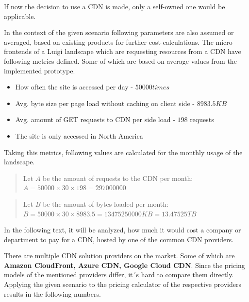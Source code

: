 If now the decision to use a CDN is made, only a self-owned one would be applicable.

In the context of the given scenario following parameters are also assumed or averaged, based on existing products for further cost-calculations.
The micro frontends of a Luigi landscape which are requesting resources from a CDN have following metrics defined. Some of which are based on average values from the implemented prototype.

\begin{itemize}[noitemsep]
	\item How often the site is accessed per day - $50 000 times$
	\item Avg. byte size per page load without caching on client side - $8983.5 KB$
	\item Avg. amount of GET requests to CDN per side load - $198$ requests 
	\item The site is only accessed in North America 
\end{itemize} 

Taking this metrics, following values are calculated for the monthly usage of the landscape.

\begin{quote}
	\begin{center}
		Let $A$ be the amount of requests to the CDN per month:
		\begin{math}
			A = 50000 \times 30 \times 198 = 297000000
		\end{math}
	\end{center} 
\end{quote}

\begin{quote}
	\begin{center}
		Let $B$ be the amount of bytes loaded per month:
		\begin{math}
			B = 50000 \times 30 \times 8983.5 = 13475250000 KB = 13.47525 TB
		\end{math}
	\end{center} 
\end{quote}

In the following text, it will be analyzed, how much it would cost a company or department to pay for a CDN, hosted by one of the common CDN providers. 

There are multiple CDN solution providers on the market. Some of which are \textbf{Amazon CloudFront, Azure CDN, Google Cloud CDN}. \cite{top_10_cdn}
Since the pricing models of the mentioned providers differ, it´s hard to compare them directly. Applying the given scenario to the pricing calculator of the respective providers results in the following numbers.

